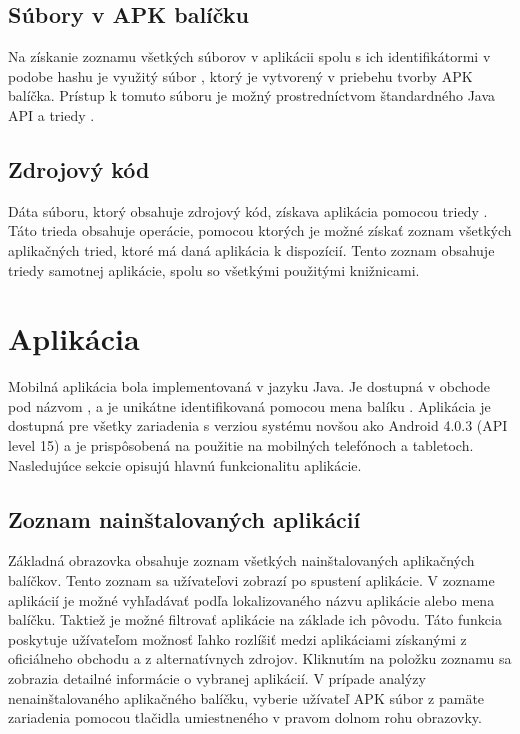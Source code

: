 
\subsection{Súbory v APK balíčku}
Na získanie zoznamu všetkých súborov v aplikácii spolu s ich identifikátormi v podobe hashu je využitý súbor , ktorý je vytvorený v priebehu tvorby APK balíčka.  Prístup k tomuto súboru je možný prostredníctvom štandardného Java API a triedy .

\subsection{Zdrojový kód}
Dáta  súboru, ktorý obsahuje zdrojový kód, získava aplikácia pomocou triedy . Táto trieda obsahuje operácie, pomocou ktorých je možné získať zoznam všetkých aplikačných tried, ktoré má daná aplikácia k dispozícií. Tento zoznam obsahuje triedy samotnej aplikácie, spolu so všetkými použitými knižnicami. 

\section{Aplikácia}
Mobilná aplikácia bola implementovaná v jazyku Java. Je dostupná v obchode  pod názvom , a je unikátne identifikovaná pomocou mena balíku . Aplikácia je dostupná pre všetky zariadenia s verziou systému novšou ako Android 4.0.3 (API level 15) a  je prispôsobená na použitie na mobilných telefónoch a tabletoch. Nasledujúce sekcie opisujú hlavnú funkcionalitu aplikácie.

\subsection{Zoznam nainštalovaných aplikácií}
Základná obrazovka obsahuje zoznam všetkých nainštalovaných aplikačných balíčkov. Tento zoznam sa užívateľovi zobrazí po spustení aplikácie. V zozname aplikácií je možné vyhľadávať podľa lokalizovaného názvu aplikácie alebo mena balíčku. Taktiež je možné filtrovať aplikácie na základe ich pôvodu. Táto funkcia poskytuje užívateľom možnosť ľahko rozlíšiť medzi aplikáciami získanými z oficiálneho obchodu a z alternatívnych zdrojov. Kliknutím na položku zoznamu sa zobrazia detailné informácie o vybranej aplikácií. V prípade analýzy nenainštalovaného aplikačného balíčku, vyberie užívateľ APK súbor z pamäte zariadenia pomocou tlačidla umiestneného v pravom dolnom rohu obrazovky. 

